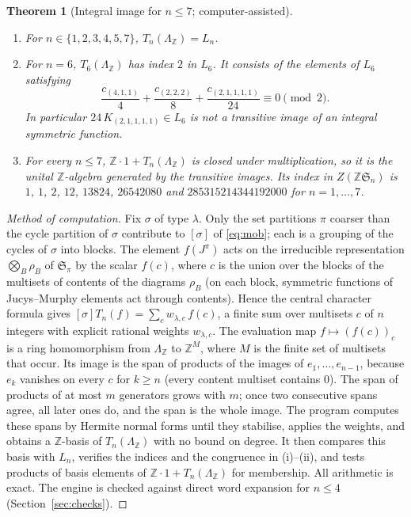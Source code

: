 \documentclass[11pt,a4paper]{article}
\newtheorem{theorem}{Theorem}[section]
\theoremstyle{definition}
\newcommand{\Sn}{\mathfrak S}
\newcommand{\Z}{\mathbb Z}
\begin{document}
\begin{theorem}[Integral image for $n\le7$; computer-assisted]\label{th:integral}
\begin{enumerate}[label=(\roman*)]
\item For $n\in\{1,2,3,4,5,7\}$, $T_n(\Lambda_\Z)=L_n$.
\item For $n=6$, $T_6(\Lambda_\Z)$ has index $2$ in $L_6$. It consists of the elements of $L_6$ satisfying
\[
 \frac{c_{(4,1,1)}}{4}+\frac{c_{(2,2,2)}}{8}+\frac{c_{(2,1,1,1,1)}}{24}\equiv0\pmod 2 .
\]
In particular $24\,K_{(2,1,1,1,1)}\in L_6$ is not a transitive image of an integral symmetric function.
\item For every $n\le7$, $\Z\cdot1+T_n(\Lambda_\Z)$ is closed under multiplication, so it is the unital $\Z$-algebra generated by the transitive images. Its index in $Z(\Z\Sn_n)$ is $1$, $1$, $2$, $12$, $13824$, $26542080$ and $285315214344192000$ for $n=1,\ldots,7$.
\end{enumerate}
\end{theorem}
\begin{proof}[Method of computation]
Fix $\sigma$ of type $\lambda$. Only the set partitions $\pi$ coarser than the cycle partition of $\sigma$ contribute to $[\sigma]$ of \eqref{eq:mob}; each is a grouping of the cycles of $\sigma$ into blocks. The element $f(J^\pi)$ acts on the irreducible representation $\bigotimes_B\rho_B$ of $\Sn_\pi$ by the scalar $f(c)$, where $c$ is the union over the blocks of the multisets of contents of the diagrams $\rho_B$ (on each block, symmetric functions of Jucys--Murphy elements act through contents). Hence the central character formula gives $[\sigma]T_n(f)=\sum_cw_{\lambda,c}\,f(c)$, a finite sum over multisets $c$ of $n$ integers with explicit rational weights $w_{\lambda,c}$. The evaluation map $f\mapsto(f(c))_c$ is a ring homomorphism from $\Lambda_\Z$ to $\Z^{M}$, where $M$ is the finite set of multisets that occur. Its image is the span of products of the images of $e_1,\ldots,e_{n-1}$, because $e_k$ vanishes on every $c$ for $k\ge n$ (every content multiset contains $0$). The span of products of at most $m$ generators grows with $m$; once two consecutive spans agree, all later ones do, and the span is the whole image. The program computes these spans by Hermite normal forms until they stabilise, applies the weights, and obtains a $\Z$-basis of $T_n(\Lambda_\Z)$ with no bound on degree. It then compares this basis with $L_n$, verifies the indices and the congruence in (i)--(ii), and tests products of basis elements of $\Z\cdot1+T_n(\Lambda_\Z)$ for membership. All arithmetic is exact. The engine is checked against direct word expansion for $n\le4$ (Section~\ref{sec:checks}).
\end{proof}
\end{document}
